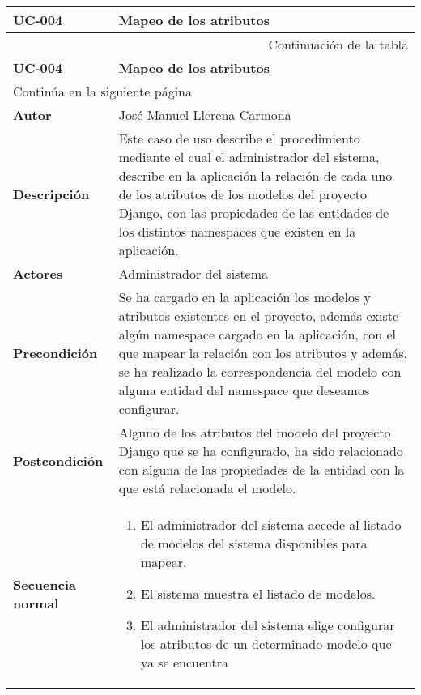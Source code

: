\begin{center}
\begin{longtable}{||p{3.4cm}|p{12cm}||}
 \hline \hline \bf UC-004 &  \bf Mapeo de los atributos \\
\hline
\endfirsthead
\hline \multicolumn{2}{|r|}{{Continuación de la tabla}} \\ \hline
 \hline \bf UC-004 &  \bf Mapeo de los atributos \\
\hline
\endhead
\hline \multicolumn{2}{|l|}{{Continúa en la siguiente página}} \\ \hline
\endfoot
\endlastfoot
 \hline \bf Autor & José Manuel Llerena Carmona \\
 \hline \bf Descripción & Este caso de uso describe el procedimiento mediante
             el cual el administrador del sistema, describe en la aplicación la
             relación de cada uno de los atributos de los modelos del proyecto
             Django, con las propiedades de las entidades de los distintos
             namespaces que existen en la aplicación.\\
 \hline \bf Actores & Administrador del sistema\\
 \hline \bf Precondición & Se ha cargado en la aplicación los modelos y
             atributos existentes en el proyecto, además existe algún namespace
             cargado en la aplicación, con el que mapear la relación con los
             atributos y además, se ha realizado la correspondencia del modelo
             con alguna entidad del namespace que deseamos configurar.\\
 \hline \bf Postcondición & Alguno de los atributos del modelo del proyecto
             Django que se ha configurado, ha sido relacionado con alguna de las
             propiedades de la entidad con la que está relacionada el modelo.\\
 \hline \bf Secuencia normal & 
             \begin{enumerate}
                \item El administrador del sistema accede al listado de
                       modelos del sistema disponibles para mapear.
                \item El sistema muestra el listado de modelos.
                \item El administrador del sistema elige configurar los
                       atributos de un determinado modelo que ya se encuentra

\end{enumerate}
\end{longtable}
\end{center}
